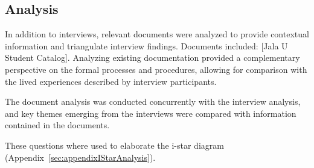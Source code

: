 \subsection*{Analysis}

In addition to interviews, relevant documents were analyzed to provide contextual information and triangulate interview findings.
Documents included: [Jala U Student Catalog].
Analyzing existing documentation provided a complementary perspective on the formal processes and procedures, allowing for comparison with the lived experiences described by interview participants.

The document analysis was conducted concurrently with the interview analysis, and key themes emerging from the interviews were compared with information contained in the documents.

These questions where used to elaborate the i-star diagram (Appendix~\ref{sec:appendixIStarAnalysis}).
